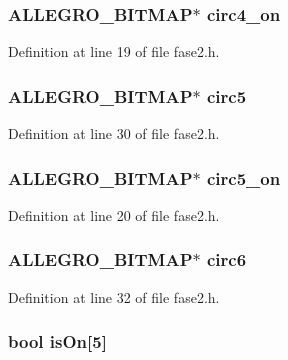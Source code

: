 \hypertarget{struct_level_dois_ae514d3cf3c3cb83de5ab4682ead1c7f6}{
\subsubsection[{circ4\-\_\-on}]{\setlength{\rightskip}{0pt plus 5cm}A\-L\-L\-E\-G\-R\-O\-\_\-\-B\-I\-T\-M\-A\-P$\ast$ circ4\-\_\-on}}\label{struct_level_dois_ae514d3cf3c3cb83de5ab4682ead1c7f6}


Definition at line 19 of file fase2.\-h.

\hypertarget{struct_level_dois_a6444f15bb917b382f7e91576f46c2706}{
\subsubsection[{circ5}]{\setlength{\rightskip}{0pt plus 5cm}A\-L\-L\-E\-G\-R\-O\-\_\-\-B\-I\-T\-M\-A\-P$\ast$ circ5}}\label{struct_level_dois_a6444f15bb917b382f7e91576f46c2706}


Definition at line 30 of file fase2.\-h.

\hypertarget{struct_level_dois_a1537bde5184cc347504f101c712fb0ee}{
\subsubsection[{circ5\-\_\-on}]{\setlength{\rightskip}{0pt plus 5cm}A\-L\-L\-E\-G\-R\-O\-\_\-\-B\-I\-T\-M\-A\-P$\ast$ circ5\-\_\-on}}\label{struct_level_dois_a1537bde5184cc347504f101c712fb0ee}


Definition at line 20 of file fase2.\-h.

\hypertarget{struct_level_dois_a727b47ddfdf73dd07d1a2832fc0f24f9}{
\subsubsection[{circ6}]{\setlength{\rightskip}{0pt plus 5cm}A\-L\-L\-E\-G\-R\-O\-\_\-\-B\-I\-T\-M\-A\-P$\ast$ circ6}}\label{struct_level_dois_a727b47ddfdf73dd07d1a2832fc0f24f9}


Definition at line 32 of file fase2.\-h.

\hypertarget{struct_level_dois_a59f6fe985ed5513f62660b2926c812aa}{
\subsubsection[{is\-On}]{\setlength{\rightskip}{0pt plus 5cm}bool is\-On\mbox{[}5\mbox{]}}}\label{struct_level_dois_a59f6fe985ed5513f62660b2926c812aa}


